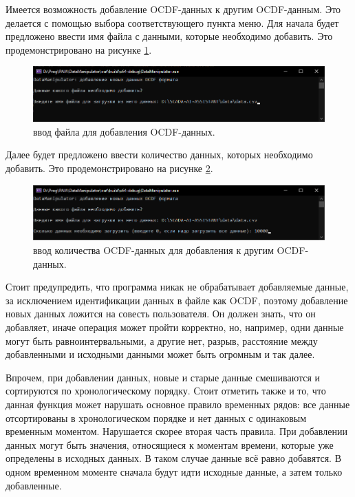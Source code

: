 {\standartFont

  \par Имеется возможность добавление OCDF-данных к другим OCDF-данным. Это делается с помощью выбора соответствующего пункта меню. Для начала будет предложено ввести имя файла с данными, которые необходимо добавить. Это продемонстрировано на рисунке \ref{fig:AddOCDF}.

  \begin{figure}[H]
    \centering
    \includegraphics[width=\textwidth]{images/forDataManipulator/AddOCDF.png}
    \caption{ввод файла для добавления OCDF-данных.} 
    \label{fig:AddOCDF}
  \end{figure}

  \par Далее будет предложено ввести количество данных, которых необходимо добавить. Это продемонстрировано на рисунке \ref{fig:AddOCDFHowMany}.
  
  \begin{figure}[H]
    \centering
    \includegraphics[width=\textwidth]{images/forDataManipulator/AddOCDFHowMany.png}
    \caption{ввод количества OCDF-данных для добавления к другим OCDF-данных.} 
    \label{fig:AddOCDFHowMany}
  \end{figure}

  \par Стоит предупредить, что программа никак не обрабатывает добавляемые данные, за исключением идентификации данных в файле как OCDF, поэтому добавление новых данных ложится на совесть пользователя. Он должен знать, что он добавляет, иначе операция может пройти корректно, но, например, одни данные могут быть равноинтервальными, а другие нет, разрыв, расстояние между добавленными и исходными данными может быть огромным и так далее. 

  \par Впрочем, при добавлении данных, новые и старые данные смешиваются и сортируются по хронологическому порядку. Стоит отметить также и то, что данная функция может нарушать основное правило временных рядов: все данные отсортированы в хронологическом порядке и нет данных с одинаковым временным моментом. Нарушается скорее вторая часть правила. При добавлении данных могут быть значения, относящиеся к моментам времени, которые уже определены в исходных данных. В таком случае данные всё равно добавятся. В одном временном моменте сначала будут идти исходные данные, а затем только добавленные. 

}
